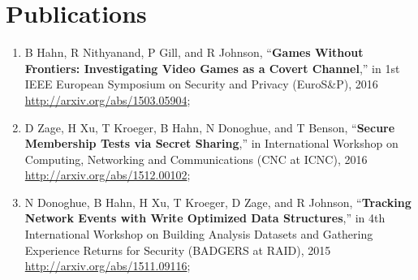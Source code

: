 \documentclass[11pt,a4paper,sans]{moderncv}        %
\begin{document}
\section{Publications}
\begin{enumerate}
	\item  B Hahn, R Nithyanand, P Gill, and R Johnson, “\textbf{Games Without Frontiers: Investigating Video Games as a Covert Channel},” in 1st IEEE European Symposium on Security and Privacy (EuroS\&P), 2016 \\ \url{http://arxiv.org/abs/1503.05904};
	\item D Zage, H Xu, T Kroeger, B Hahn, N Donoghue, and T Benson, “\textbf{Secure Membership Tests via Secret Sharing},” in International Workshop on Computing, Networking and Communications (CNC at ICNC), 2016 \\
	\url{http://arxiv.org/abs/1512.00102};
	\item N Donoghue, B Hahn, H Xu, T Kroeger, D Zage, and R Johnson, “\textbf{Tracking Network Events with Write Optimized Data Structures},” in 4th International Workshop on Building Analysis Datasets and Gathering Experience Returns for Security (BADGERS at RAID), 2015\\
	\url{http://arxiv.org/abs/1511.09116};
\end{enumerate}

\clearpage
\end{document}
